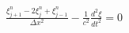\documentclass[preview]{standalone}
\begin{document}
\begin{align*}
\frac{\xi_{j+1}^{n} - 2 \xi_{j}^{n} + \xi_{j-1}^{n}}{\Delta x^2} - \frac{1}{c^2}\frac{d^2 \xi}{dt^2}  = 0
\end{align*}
\end{document}
